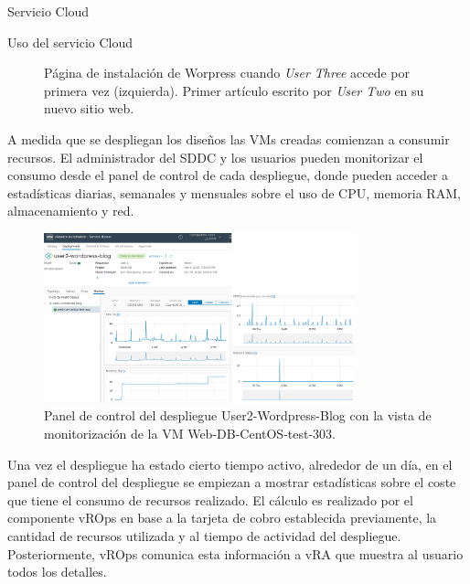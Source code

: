 \begin{subsection}{Servicio Cloud}
\begin{subsubsection}{Uso del servicio Cloud}
\begin{figure}[h]
            \caption{Página de instalación de Worpress cuando \textit{User Three} accede por primera vez (izquierda). Primer artículo escrito por \textit{User Two} en su nuevo sitio web.}
            \label{fig:wordpress-user-2}
        \end{figure}
        \FloatBarrier
        A medida que se despliegan los diseños las VMs creadas comienzan a consumir recursos. El administrador del SDDC y los usuarios pueden monitorizar el consumo desde el panel de control de cada despliegue, donde pueden acceder a estadísticas diarias, semanales y mensuales sobre el uso de CPU, memoria RAM, almacenamiento y red.
        \begin{figure}[h]
            \centering
            \includegraphics[width=0.8\textwidth]{imaxes/pruebaconcepto/vrealize/statistics-service-broker.png}
            \caption{Panel de control del despliegue User2-Wordpress-Blog con la vista de monitorización de la VM Web-DB-CentOS-test-303.}
            \label{fig:statistics-user-2}
        \end{figure}
        \FloatBarrier
        Una vez el despliegue ha estado cierto tiempo activo, alrededor de un día, en el panel de control del despliegue se empiezan a mostrar estadísticas sobre el coste que tiene el consumo de recursos realizado. El cálculo es realizado por el componente vROps en base a la tarjeta de cobro establecida previamente, la cantidad de recursos utilizada y al tiempo de actividad del despliegue. Posteriormente, vROps comunica esta información a vRA que muestra al usuario todos los detalles.

\end{subsubsection}
\end{subsection}
